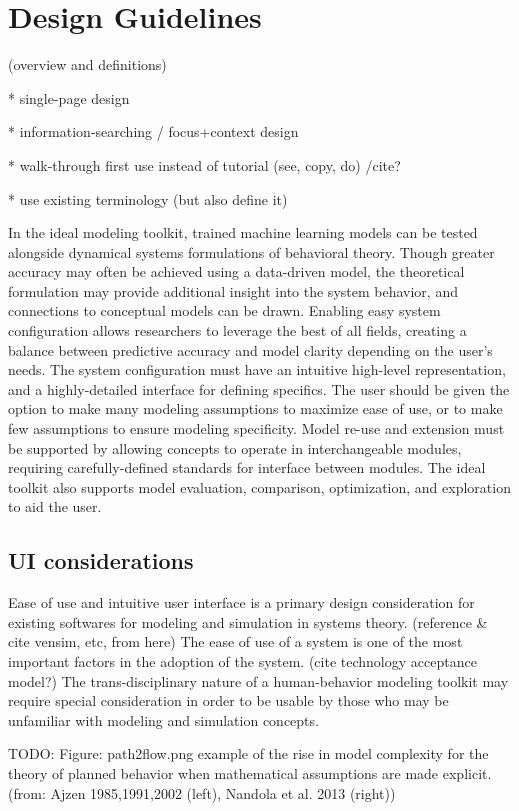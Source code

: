 \section{Design Guidelines}
(overview and definitions)

* single-page design

* information-searching / focus+context design

* walk-through first use instead of tutorial (see, copy, do) /cite{?}

* use existing terminology (but also define it)

In the ideal modeling toolkit, trained machine learning models can be tested alongside dynamical systems formulations of behavioral theory. 
Though greater accuracy may often be achieved using a data-driven model, the theoretical formulation may provide additional insight into the system behavior, and connections to conceptual models can be drawn. 
Enabling easy system configuration allows researchers to leverage the best of all fields, creating a balance between predictive accuracy and model clarity depending on the user’s needs. 
The system configuration must have an intuitive high-level representation, and a highly-detailed interface for defining specifics. 
The user should be given the option to make many modeling assumptions to maximize ease of use, or to make few assumptions to ensure modeling specificity. 
Model re-use and extension must be supported by allowing concepts to operate in interchangeable modules, requiring carefully-defined standards for interface between modules. 
The ideal toolkit also supports model evaluation, comparison, optimization, and exploration to aid the user.

\subsection{UI considerations}
Ease of use and intuitive user interface is a primary design consideration for existing softwares for modeling and simulation in systems theory. (reference & cite vensim, etc, from here) 
The ease of use of a system is one of the most important factors in the adoption of the system. (cite technology acceptance model?) 
The trans-disciplinary nature of a human-behavior modeling toolkit may require special consideration in order to be usable by those who may be unfamiliar with modeling and simulation concepts.

TODO: Figure: path2flow.png example of the rise in model complexity for the theory of planned behavior when mathematical assumptions are made explicit. (from: Ajzen 1985,1991,2002 (left), Nandola et al. 2013 (right))
